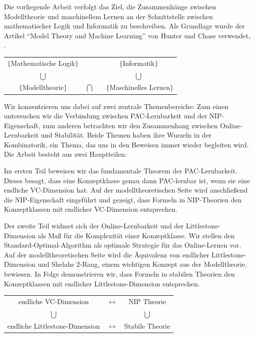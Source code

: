 \begin{outline}
\0 Die vorliegende Arbeit verfolgt das Ziel, die Zusammenhänge zwischen Modelltheorie und maschinellem Lernen an der Schnittstelle zwischen mathematischer Logik und Informatik zu beschreiben. Als Grundlage wurde der Artikel \enquote{Model Theory and Machine Learning} von Hunter und Chase verwendet, \cite{chase2019model}.

\begin{center}
\begin{tabular}{ c c c } 
$\{$Mathematische Logik$\}$ &  & ~$\{$Informatik$\}$ \\
$\bigcup$ & & ~$\bigcup$ \\
$\{$Modelltheorie$\}$ & $\bigcap$ & \quad~ $\{$Maschinelles Lernen$\}$
\end{tabular}
\end{center}

Wir konzentrieren uns dabei auf zwei zentrale Themenbereiche: Zum einen untersuchen wir die Verbindung zwischen PAC-Lernbarkeit und der NIP-Eigenschaft, zum anderen betrachten wir den Zusammenhang zwischen Online-Lernbarkeit und Stabilität. Beide Themen haben ihre Wurzeln in der Kombinatorik, ein Thema, das uns in den Beweisen immer wieder begleiten wird. Die Arbeit besteht aus zwei Hauptteilen:

Im ersten Teil beweisen wir das fundamentale Theorem der PAC-Lernbarkeit. Dieses besagt, dass eine Konzeptklasse genau dann PAC-lernbar ist, wenn sie eine endliche VC-Dimension hat. Auf der modelltheoretischen Seite wird anschließend die NIP-Eigenschaft eingeführt und gezeigt, dass Formeln in NIP-Theorien den Konzeptklassen mit endlicher VC-Dimension entsprechen.

Der zweite Teil widmet sich der Online-Lernbarkeit und der Littlestone-Dimension als Maß für die Komplexität einer Konzeptklasse. Wir stellen den Standard-Optimal-Algorithm als optimale Strategie für das Online-Lernen vor. Auf der modelltheoretischen Seite wird die Äquivalenz von endlicher Littlestone-Dimension und Shelahs 2-Rang, einem wichtigen Konzept aus der Modelltheorie, bewiesen. In Folge demonstrieren wir, dass Formeln in stabilen Theorien den Konzeptklassen mit endlicher Littlestone-Dimension entsprechen.

\begin{center}
\begin{tabular}{ c c c } 
endliche VC-Dimension & $\longleftrightarrow$ & NIP Theorie \\
$\bigcup$ & & $\bigcup$\\
endliche Littlestone-Dimension & $\longleftrightarrow$ & Stabile Theorie
\end{tabular}
\end{center}


\end{outline}
